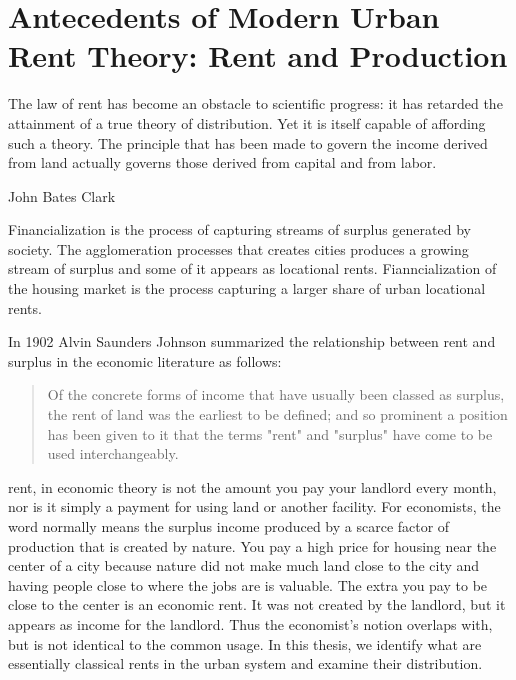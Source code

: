 \chapter{Antecedents of Modern Urban Rent Theory: Rent and Production} \label{chapter-rent}
\epigraph{The law of rent has become an obstacle to scientific progress: it has retarded the attainment of a true theory of distribution. Yet it is itself capable of affording such a theory. The principle that has been made to govern the income derived from land actually governs those derived from capital and from labor. }{John Bates Clark \cite{clarkDistributionDeterminedLaw1891}}



Financialization is the process of capturing streams of surplus generated by society. The agglomeration processes that creates cities produces a growing stream of surplus and some of it appears as locational rents. Fianncialization of the housing market is the process capturing a larger share of urban locational rents. %

In 1902 Alvin Saunders Johnson \cite{johnsonRentModernEconomic1902} summarized the relationship between rent and surplus in the economic literature as follows: 

\begin{quotation}Of the concrete forms of income that have usually been classed as surplus, the rent of land was the earliest to be defined; and so prominent a position has been given to it that the terms "rent" and "surplus" have come to be used interchangeably.\end{quotation} 

\Gls{rent}, in economic theory is not the amount you pay your landlord every month, nor is it simply a payment for using land or another facility.  For economists, the word normally means the \gls{surplus} income produced by a scarce factor of production that is created by nature. You pay a high price for housing near the center of a city because nature did not make much land close to the city and having people close to where the jobs are is valuable. The extra you pay to be close to the center is an economic rent. It was not created by the landlord, but it appears as income for the landlord. Thus the economist's notion overlaps with, but is not identical to the common usage. In this thesis, we identify what are essentially classical rents in the urban system and examine their distribution.

